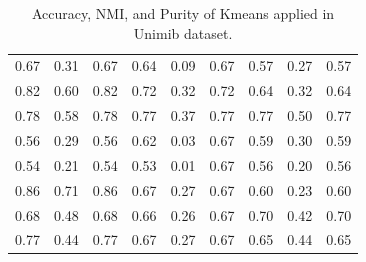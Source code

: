 \documentclass[10pt,final]{IEEEtran}
\begin{document}
\begin{center}
\begin{table}
\begin{tabular}{|c|c|c|c|c|c|c|c|c|}
    0.67 & 0.31 & 0.67 & 0.64 & 0.09 & 0.67 & 0.57 & 0.27 & 0.57\\
    0.82 & 0.60 & 0.82 & 0.72 & 0.32 & 0.72 & 0.64 & 0.32 & 0.64\\
    0.78 & 0.58 & 0.78 & 0.77 & 0.37 & 0.77 & 0.77 & 0.50 & 0.77\\
    0.56 & 0.29 & 0.56 & 0.62 & 0.03 & 0.67 & 0.59 & 0.30 & 0.59\\
    0.54 & 0.21 & 0.54 & 0.53 & 0.01 & 0.67 & 0.56 & 0.20 & 0.56\\
    0.86 & 0.71 & 0.86 & 0.67 & 0.27 & 0.67 & 0.60 & 0.23 & 0.60\\
    0.68 & 0.48 & 0.68 & 0.66 & 0.26 & 0.67 & 0.70 & 0.42 & 0.70\\
    0.77 & 0.44 & 0.77 & 0.67 & 0.27 & 0.67 & 0.65 & 0.44 & 0.65\\
    \hline
\end{tabular}
\caption{\label{tab: Table IV}Accuracy, NMI, and Purity of Kmeans applied in Unimib dataset.}
\end{table}
\end{center}
\end{document}
